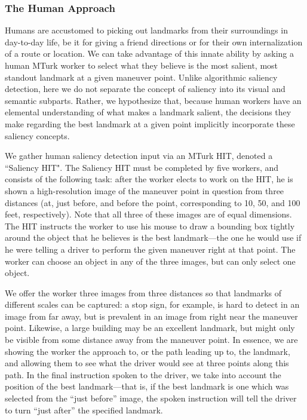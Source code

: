 \subsubsection{The Human Approach}
Humans are accustomed to picking out landmarks from their surroundings in day-to-day life, be it for giving a friend directions or for their own internalization of a route or location. We can take advantage of this innate ability by asking a human MTurk worker to select what they believe is the most salient, most standout landmark at a given maneuver point. Unlike algorithmic saliency detection, here we do not separate the concept of saliency into its visual and semantic subparts. Rather, we hypothesize that, because human workers have an elemental understanding of what makes a landmark salient, the decisions they make regarding the best landmark at a given point implicitly incorporate these saliency concepts.

We gather human saliency detection input via an MTurk HIT, denoted a ``Saliency HIT". The Saliency HIT must be completed by five workers, and consists of the following task: after the worker elects to work on the HIT, he is shown a high-resolution image of the maneuver point in question from three distances (at, just before, and before the point, corresponding to 10, 50, and 100 feet, respectively). Note that all three of these images are of equal dimensions. The HIT instructs the worker to use his mouse to draw a bounding box tightly around the object that he believes is the best landmark---the one he would use if he were telling a driver to perform the given maneuver right at that point. The worker can choose an object in any of the three images, but can only select one object.

We offer the worker three images from three distances so that landmarks of different scales can be captured: a stop sign, for example, is hard to detect in an image from far away, but is prevalent in an image from right near the maneuver point. Likewise, a large building may be an excellent landmark, but might only be visible from some distance away from the maneuver point. In essence, we are showing the worker the approach to, or the path leading up to, the landmark, and allowing them to see what the driver would see at three points along this path. In the final instruction spoken to the driver, we take into account the position of the best landmark---that is, if the best landmark is one which was selected from the “just before” image, the spoken instruction will tell the driver to turn “just after” the specified landmark.

